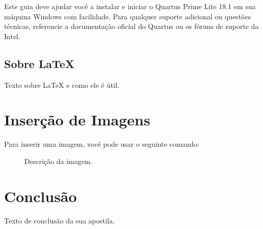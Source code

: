\documentclass[12pt,a4paper]{article}
\begin{document}
Este guia deve ajudar você a instalar e iniciar o Quartus Prime Lite 18.1 em sua máquina Windows com facilidade. Para qualquer suporte adicional ou questões técnicas, referencie a documentação oficial do Quartus ou os fóruns de suporte da Intel.


\subsection{Sobre LaTeX}
Texto sobre LaTeX e como ele é útil.

\section{Inserção de Imagens}
Para inserir uma imagem, você pode usar o seguinte comando:

\begin{figure}[H]
    \centering
    \caption{Descrição da imagem.}
    \label{fig:imagem1}
\end{figure}

\section{Conclusão}
Texto de conclusão da sua apostila.
\end{document}

